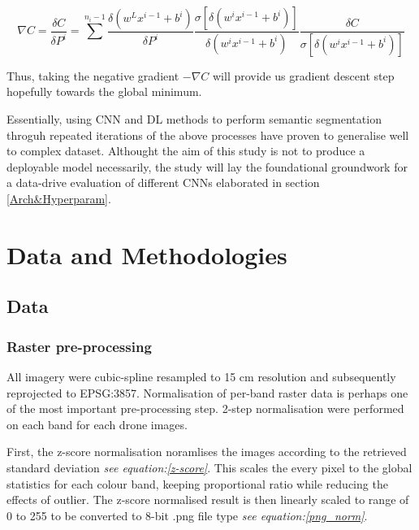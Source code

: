 \documentclass[11pt, a4paper, twoside]{report}
\begin{document}
\begin{equation}
  \label{Sum_cost_derivative}
  \nabla C = \frac{\delta C}{\delta P^{i}} = \sum^{n_{i}-1} \frac{\delta(w^{L}x^{i-1} + b^{i})}{\delta P^{i}} \frac{\sigma[\delta(w^{i}x^{i-1} + b^{i})]}{\delta (w^{i}x^{i-1} + b^{i})} \frac{\delta C}{\sigma[\delta(w^{i}x^{i-1} + b^{i})]}
\end{equation}

Thus, taking the negative gradient $-\nabla C$ will provide us gradient descent step hopefully towards the global minimum.\\\par

Essentially, using CNN and DL methods to perform semantic segmentation throguh repeated iterations of the above processes have proven to generalise well to complex dataset. Althought the aim of this study is not to produce a deployable model necessarily, the study will lay the foundational groundwork for a data-drive evaluation of different CNNs elaborated in section \ref{Arch&Hyperparam}.\\\par

\newpage

\chapter{Data and Methodologies}\label{DataandMethods}

\section{Data}\label{Data}

\subsection{Raster pre-processing}

All imagery were cubic-spline resampled to 15 cm resolution and subsequently reprojected to EPSG:3857. Normalisation of per-band raster data is perhaps one of the most important pre-processing step. 2-step normalisation were performed on each band for each drone images.\\\par

First, the z-score normalisation noramlises the images according to the retrieved standard deviation \textit{see equation:\ref{z-score}}. This scales the every pixel to the global statistics for each colour band, keeping proportional ratio while reducing the effects of outlier. The z-score normalised result is then linearly scaled to range of 0 to 255 to be converted to 8-bit .png file type \textit{see equation:\ref{png_norm}}.
\end{document}
